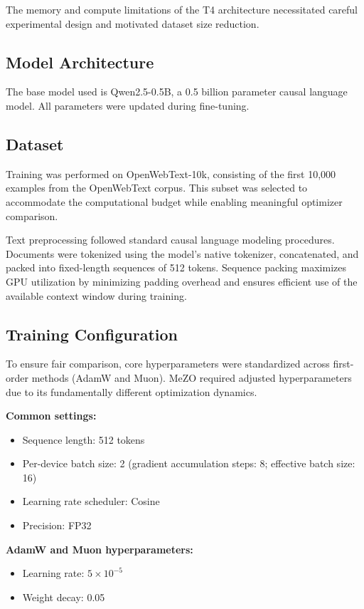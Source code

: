 \documentclass{article}
\begin{document}
The memory and compute limitations of the T4 architecture necessitated careful experimental design and motivated dataset size reduction.

\subsection{Model Architecture}

The base model used is Qwen2.5-0.5B, a 0.5 billion parameter causal language model. All parameters were updated during fine-tuning.

\subsection{Dataset}

Training was performed on OpenWebText-10k, consisting of the first 10,000 examples from the OpenWebText corpus. This subset was selected to accommodate the computational budget while enabling meaningful optimizer comparison.

Text preprocessing followed standard causal language modeling procedures. Documents were tokenized using the model’s native tokenizer, concatenated, and packed into fixed-length sequences of 512 tokens. Sequence packing maximizes GPU utilization by minimizing padding overhead and ensures efficient use of the available context window during training.

\subsection{Training Configuration}

To ensure fair comparison, core hyperparameters were standardized across first-order methods (AdamW and Muon). MeZO required adjusted hyperparameters due to its fundamentally different optimization dynamics.

\textbf{Common settings:}
\begin{itemize}
    \item Sequence length: 512 tokens
    \item Per-device batch size: 2 (gradient accumulation steps: 8; effective batch size: 16)
    \item Learning rate scheduler: Cosine
    \item Precision: FP32
\end{itemize}

\textbf{AdamW and Muon hyperparameters:}
\begin{itemize}
    \item Learning rate: $5 \times 10^{-5}$
    \item Weight decay: 0.05
\end{itemize}
\end{document}
